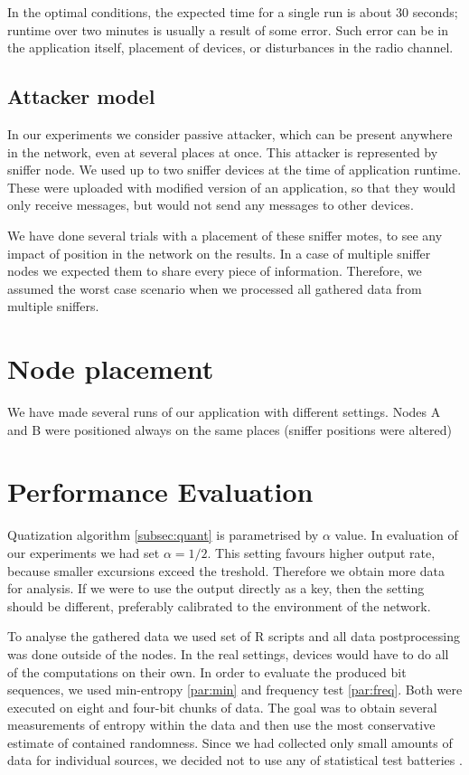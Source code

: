 \documentclass[
  print, %
  Table,   %
  nolof,     %
  nolot,     %
           oneside
]{fithesis3}
\begin{document}
In the optimal conditions, the expected time for a single run is about 30 seconds; runtime over two minutes is usually a result of some error. Such error can be in the application itself, placement of devices, or disturbances in the radio channel.

\subsection{Attacker model}
  In our experiments we consider passive attacker, which can be present anywhere in the network, even at several places at once. This attacker is represented by sniffer node. We used up to two sniffer devices at the time of application runtime. These were uploaded with modified version of an application, so that they would only receive messages, but would not send any messages to other devices.

  We have done several trials with a placement of these sniffer motes, to see any impact of position in the network on the results. In a case of multiple sniffer nodes we expected them to share every piece of information. Therefore, we assumed the worst case scenario when we processed all gathered data from multiple sniffers.



\section{Node placement}
We have made several runs of our application with different settings. Nodes A and B were positioned always on the same places (sniffer positions were altered)

  \section{Performance Evaluation}\label{sec:results}

  Quatization algorithm \ref{subsec:quant} is parametrised by $\alpha$ value. In evaluation of our experiments we had set $\alpha = 1/2$. This setting favours higher output rate, because smaller excursions exceed the treshold. Therefore we obtain more data for analysis. If we were to use the output directly as a key, then the setting should be different, preferably calibrated to the environment of the network.

  To analyse the gathered data we used set of R scripts and all data postprocessing was done outside of the nodes. In the real settings, devices would have to do all of the computations on their own. In order to evaluate the produced bit sequences, we used min-entropy \ref{par:min} and frequency test \ref{par:freq}. Both were executed on eight and four-bit chunks of data. The goal was to obtain several measurements of entropy within the data and then use the most conservative estimate of contained randomness. Since we had collected only small amounts of data for individual sources, we decided not to use any of statistical test batteries \cite{rukhin2001statistical}.
\end{document}
